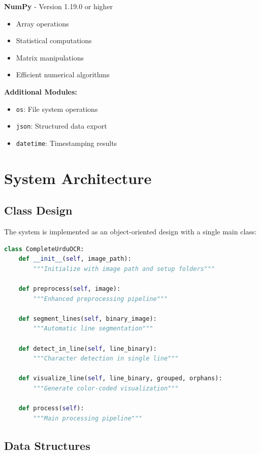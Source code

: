 \documentclass[12pt,a4paper,oneside]{report}
\begin{document}
\textbf{NumPy} - Version 1.19.0 or higher
\begin{itemize}
    \item Array operations
    \item Statistical computations
    \item Matrix manipulations
    \item Efficient numerical algorithms
\end{itemize}

\textbf{Additional Modules:}
\begin{itemize}
    \item \texttt{os}: File system operations
    \item \texttt{json}: Structured data export
    \item \texttt{datetime}: Timestamping results
\end{itemize}

\section{System Architecture}

\subsection{Class Design}

The system is implemented as an object-oriented design with a single main class:

\begin{lstlisting}[language=Python, caption=Class Structure]
class CompleteUrduOCR:
    def __init__(self, image_path):
        """Initialize with image path and setup folders"""
        
    def preprocess(self, image):
        """Enhanced preprocessing pipeline"""
        
    def segment_lines(self, binary_image):
        """Automatic line segmentation"""
        
    def detect_in_line(self, line_binary):
        """Character detection in single line"""
        
    def visualize_line(self, line_binary, grouped, orphans):
        """Generate color-coded visualization"""
        
    def process(self):
        """Main processing pipeline"""
\end{lstlisting}

\subsection{Data Structures}
\end{document}
